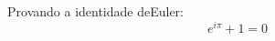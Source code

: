 \documentclass[preview]{standalone}
\begin{document}
\begin{center}
Provando a identidade deEuler: $$ e^{i\pi}+1=0 $$
\end{center}
\end{document}
